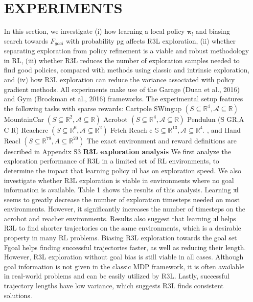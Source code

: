 \documentclass{article}
\newcounter{n}
\begin{document}
\section*{ EXPERIMENTS}
In this section, we investigate (i) how learning a local policy ${\boldsymbol{\pi}}_{l}$ and biasing search towards ${F}_{goal}$ with 
probability pg affects R3L exploration, (ii) whether separating exploration from policy refinement
is a viable and robust methodology in RL, (iii) whether R3L reduces the number of exploration
samples needed to find good policies, compared with methods using classic and intrinsic exploration,
and (iv) how R3L exploration can reduce the variance associated with policy gradient methods.
All experiments make use of the Garage (Duan et al., 2016) and Gym (Brockman et al., 2016)
frameworks. The experimental setup features the following tasks with sparse rewards: Cartpole
SWingup $(S\subseteq\mathbb{R}^{4},{\mathcal{A}}\subseteq\mathbb{R})$ MountainCar $(S\subseteq\mathbb{R}^{2},{\mathcal{A}}\subseteq\mathbb{R})$ Acrobot $(S\subseteq\mathbb{R}^{4},{\mathcal{A}}\subseteq\mathbb{R})$ Pendulun (S GR,A C R) Reacherc $(S\subseteq\mathbb{R}^{6},{\mathcal{A}}\subseteq\mathbb{R}^{2})$ Fetch Reach c $\mathbb{S}\subseteq\mathbb{R}^{13},{\mathcal{A}}\subseteq\mathbb{R}^{4}.$ , and Hand Reacl $(S\subseteq\mathbb{R}^{78},A\subseteq\mathbb{R}^{20})$ The exact environment and reward definitions are described in Appendix S3
\textbf{R3L exploration analysis} We first analyze the exploration performance of R3L in a limited set of
RL environments, to determine the impact that learning policy πl has on exploration speed. We also
investigate whether R3L exploration is viable in environments where no goal information is available.
Table 1 shows the results of this analysis. Learning πl seems to greatly decrease the number of
exploration timesteps needed on most environments. However, it significantly increases the number
of timesteps on the acrobot and reacher environments. Results also suggest that learning πl helps
R3L to find shorter trajectories on the same environments, which is a desirable property in many RL
problems. Biasing R3L exploration towards the goal set Fgoal helps finding successful trajectories
faster, as well as reducing their length. However, R3L exploration without goal bias is still viable in
all cases. Although goal information is not given in the classic MDP framework, it is often available
in real-world problems and can be easily utilized by R3L. Lastly, successful trajectory lengths have
low variance, which suggests R3L finds consistent solutions.
\end{document}
